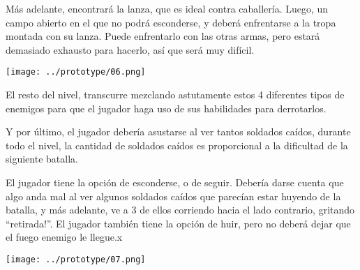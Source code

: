   Más adelante, encontrará la lanza, que es ideal contra caballería. Luego, un campo abierto en el que no podrá esconderse, y deberá enfrentarse a la tropa montada con su lanza. Puede enfrentarlo con las otras armas, pero estará demasiado exhausto para hacerlo, así que será muy difícil.
  \begin{center}
    \texttt{[image: ../prototype/06.png]}
  \end{center}

  El resto del nivel, transcurre mezclando astutamente estos 4 diferentes tipos de enemigos para que el jugador haga uso de sus habilidades para derrotarlos.

  Y por último, el jugador debería asustarse al ver tantos soldados caídos, durante todo el nivel, la cantidad de soldados caídos es proporcional a la dificultad de la siguiente batalla.

  El jugador tiene la opción de esconderse, o de seguir. Debería darse cuenta que algo anda mal al ver algunos soldados caídos que parecían estar huyendo de la batalla, y más adelante, ve a 3 de ellos corriendo hacia el lado contrario, gritando ``retirada!''. El jugador también tiene la opción de huir, pero no deberá dejar que el fuego enemigo le llegue.x
  
  \begin{center}
    \texttt{[image: ../prototype/07.png]}
  \end{center}


  
